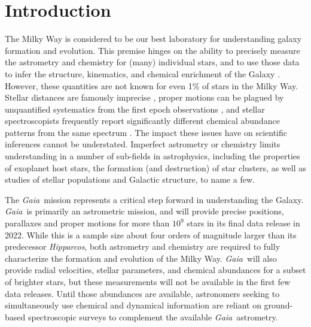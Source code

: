 \documentclass[preprint]{aastex}
\newcommand{\project}[1]{\textsl{#1}}
\newcommand{\gaia}{\project{Gaia}}
\newcommand{\hipparcos}{\project{Hipparcos}}
\begin{document}


\section{Introduction} 
\label{sec:introduction}

The Milky Way is considered to be our best laboratory for understanding galaxy
formation and evolution.  This premise hinges on the ability to precisely measure 
the astrometry and chemistry for (many) individual stars, and to use those data 
to infer the structure, kinematics, and chemical enrichment of the Galaxy 
\citep[e.g.,][]{Nordstrom_2004,Schlaufman_2009,Deason_2011,Casagrande_2011,
Ness_2012,Ness_2013a,Ness_2013b,Casey_2012,Casey_2013,Casey_2014a,Casey_2014b,
Boeche_2013,Kordopatis_2015,Bovy_2016}.  However, these quantities are not known
for even 1\% of stars in the Milky Way.  Stellar distances are famously imprecise 
\citep[e.g.,][]{van_Leeuwen_2007,Jofre_2015,Madler_2016}, proper motions can be
plagued by unquantified systematics from the first epoch observations 
\citep[e.g.,][]{Casey_Schlaufman_2015}, and stellar spectroscopists frequently 
report significantly different chemical abundance patterns from the same spectrum 
\citep{Smiljanic_2014}.  The impact these issues have on scientific inferences 
cannot be understated.  Imperfect astrometry or chemistry limits understanding 
in a number of sub-fields in astrophysics, including the properties of exoplanet 
host stars, the formation (and destruction) of star clusters, as well as studies
of stellar populations and Galactic structure, to name a few.


The \gaia\ mission represents a critical step forward in understanding the Galaxy.
\gaia\ is primarily an astrometric mission, and will provide precise positions,
parallaxes and proper motions for more than $10^9$ stars in its final data
release in 2022.  While this is a sample size about four orders of magnitude 
larger than its predecessor \hipparcos, both astrometry and chemistry are 
required to fully characterize the formation and evolution of the Milky Way. 
\gaia\ will also provide radial velocities, stellar parameters, and chemical 
abundances for a subset of brighter stars, but these measurements will not be 
available in the first few data releases. Until those abundances are available,
astronomers seeking to simultaneously use chemical and dynamical information are
reliant on ground-based spectroscopic surveys to complement the available 
\gaia\ astrometry.
\end{document}
